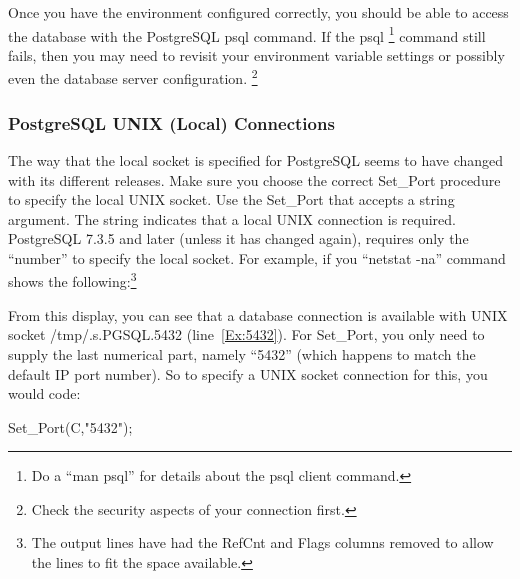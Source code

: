 \documentclass[english,letterpaper]{book}
\begin{document}
Once you have the environment configured correctly, you should be
able to access the database with the PostgreSQL psql command. If the
psql%
\footnote{Do a ``man psql'' for details about the psql client command.%
} command still fails, then you may need to revisit your environment
variable settings or possibly even the database server configuration.%
\footnote{Check the security aspects of your connection first.%
}


\subsubsection{PostgreSQL UNIX (Local) Connections}

The way that the local socket is specified for PostgreSQL seems to
have changed with its different releases. Make sure you choose the
correct Set\_Port procedure to specify the local UNIX socket. Use
the Set\_Port that accepts a string argument. The string indicates
that a local UNIX connection is required. PostgreSQL 7.3.5 and later
(unless it has changed again), requires only the ``number'' to
specify the local socket. For example, if you ``netstat -na'' command
shows the following:\footnote{The output lines have had the RefCnt
and Flags columns removed to allow the lines to fit the space
available.}


From this display, you can see that a database connection is available
with UNIX socket /tmp/.s.PGSQL.5432 (line~\ref{Ex:5432}). For Set\_Port, you only need
to supply the last numerical part, namely ``5432'' (which happens
to match the default IP port number). So to specify a UNIX socket
connection for this, you would code:

\begin{Example}

   Set_Port(C,"5432");

\end{Example}
\end{document}
